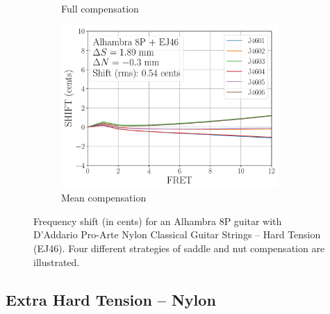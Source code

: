 \begin{figure}
\begin{subfigure}[b]{0.45\textwidth}
   \caption{Full compensation}
   \label{fig:shift_alhambra8p_ej46_full}
  \end{subfigure}
  \hspace{0.25in}
  \begin{subfigure}[b]{0.45\textwidth}
   \centering
   \includegraphics[width=3.25in]{../figures/shift_alhambra8p_ej46_mean}
   \caption{Mean compensation}
   \label{fig:shift_alhambra8p_ej46_mean}
  \end{subfigure}
  \caption{\label{fig:compensation_alhambra8p_ej46} Frequency shift (in cents) for an Alhambra 8P guitar with D'Addario Pro-Arte Nylon Classical Guitar Strings -- Hard Tension (EJ46). Four different strategies of saddle and nut compensation are illustrated.}
 \end{figure}

 \newpage
 \subsection{Extra Hard Tension -- Nylon}


